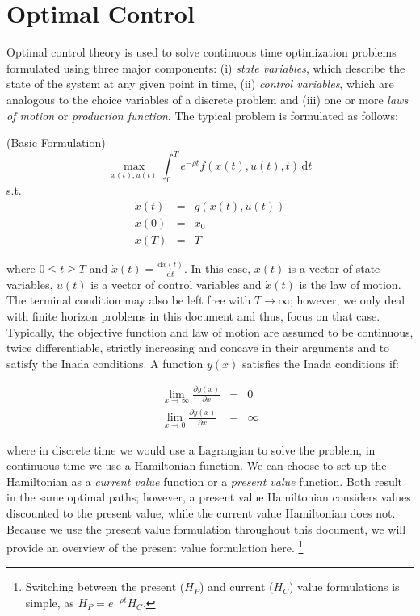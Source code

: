 \section{Optimal Control}
\label{section:mathappendix}


\noindent Optimal control theory is used to solve continuous time optimization problems formulated using three major components: (i) \textit{state variables}, which describe the state of the system at any given point in time, (ii) \textit{control variables}, which are analogous to the choice variables of a discrete problem and (iii) one or more \textit{laws of motion} or \textit{production function}. The typical problem is formulated as follows:


\begin{problem} \label{problem:basicform} (Basic Formulation)
\begin{equation}
\max_{x(t), u(t)} \int_0^T \! e^{- \rho t} f(x(t),u(t),t) \, \mathrm{d}t \label{eq:problem1}
\end{equation}
\noindent s.t.
\begin{eqnarray}
\dot{x}(t) &=& g(x(t),u(t)) \nonumber \\
x(0) &=& x_0 \nonumber \\
x(T) &=& T  \nonumber
\end{eqnarray}
\end{problem}

\noindent where $ 0\leq t \geq T $ and $\dot{x}(t) = \frac{\mathrm{d}x(t)}{\mathrm{d}t}$. In this case, $x(t) $ is a vector of state variables, $u(t) $ is a vector of control variables and $ \dot{x}(t) $ is the law of motion. The terminal condition may also be left free with $T \rightarrow \infty$; however, we only deal with finite horizon problems in this document and thus, focus on that case. Typically, the objective function and law of motion are assumed to be continuous, twice differentiable, strictly increasing and concave in their arguments and to satisfy the Inada conditions. A function $y(x)$ satisfies the Inada conditions if: 

\begin{eqnarray}
\lim_{ x \to \infty} \frac{\partial y(x)}{\partial x} &=& 0 \nonumber \\
\lim_{ x \to 0} \frac{\partial y(x)}{\partial x} &=& \infty \nonumber
\end{eqnarray}

\noindent where in discrete time we would use a Lagrangian to solve the problem, in continuous time we use a Hamiltonian function. We can choose to set up the Hamiltonian as a \textit{current value} function or a \textit{present value} function. Both result in the same optimal paths; however, a present value Hamiltonian considers values discounted to the present value, while the current value Hamiltonian does not. Because we use the present value formulation throughout this document, we will provide an overview of the present value formulation here. \footnote{Switching between the present ($H_P$) and current ($H_C$) value formulations is simple, as $H_P = e^{-\rho t}H_C $.}

